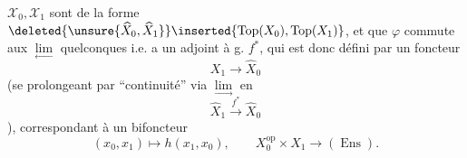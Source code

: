 $\mathcal X_0,\mathcal X_1$ sont de la forme $\deleted{\unsure{\widehat X_0,\widehat X_1}}\inserted{\operatorname{Top}(X_0),\operatorname{Top}(X_1)}$, et que $\varphi$ commute aux $\underset{\leftarrow}{\lim}$ quelconques i.e. a un adjoint à g. $f^*$, qui est donc défini par un foncteur
\[
X_1\longrightarrow\widehat X_0
\]
(se prolongeant par ``continuité'' via $\underset{\longrightarrow}{\lim}$ en
\[
\widehat X_1\xrightarrow{f^*}\widehat X_0
\]
), correspondant à un bifoncteur
\[
(x_0,x_1)\longmapsto h(x_1,x_0),\qquad X_0^{\mathrm{op}}\times X_1\longrightarrow(\operatorname{Ens}).
\]
